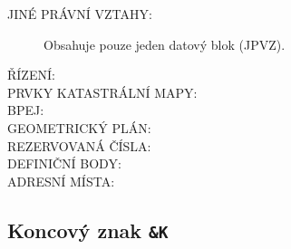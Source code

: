 \documentclass[a4paper,12pt,oneside]{book}
\begin{document}
\begin{description}
 \item[JINÉ PRÁVNÍ VZTAHY:] Obsahuje pouze jeden datový blok (JPVZ).

 \item[ŘÍZENÍ:]
 
 \item[PRVKY KATASTRÁLNÍ MAPY:]
 
 \item[BPEJ:]
 
 \item[GEOMETRICKÝ PLÁN:]
 
 \item[REZERVOVANÁ ČÍSLA:]
 
 \item[DEFINIČNÍ BODY:]
 
 \item[ADRESNÍ MÍSTA:]
 
\end{description}





\subsection{Koncový znak \texttt{\&K}}


\cite{dp_landa}
\cite{vfk_struktura}












\clearpage
\rhead{{\rightmark}}		%
\renewcommand{\refname}{Použitá literatura}



\clearpage
\listoffigures

\clearpage
\listoftables

\newpage
\appendix

\setcounter{page}{1}   	%

\end{document}

